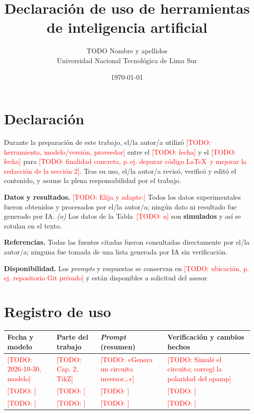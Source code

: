 \documentclass[12pt,a4paper]{article}
\title{Declaración de uso de herramientas de inteligencia artificial}
\author{TODO Nombre y apellidos \\ Universidad Nacional Tecnológica de Lima Sur}
\date{\today}
\newcommand{\todo}[1]{\textcolor{red}{[TODO: #1]}}
\begin{document}
\maketitle

\section{Declaración}
Durante la preparación de este trabajo, el/la autor/a utilizó
\todo{herramienta, modelo/versión, proveedor} entre el \todo{fecha} y el \todo{fecha}
para \todo{finalidad concreta, p.\,ej. depurar código \LaTeX\ y mejorar la redacción de la sección 2}.
Tras su uso, el/la autor/a revisó, verificó y editó el contenido, y asume la plena
responsabilidad por el trabajo.

\medskip
\noindent
\textbf{Datos y resultados.} \todo{Elija y adapte:}
Todos los datos experimentales fueron obtenidos y procesados por el/la autor/a;
ningún dato ni resultado fue generado por IA. \emph{(o)} Los datos de la Tabla~\todo{n}
son \textbf{simulados} y así se rotulan en el texto.

\medskip
\noindent
\textbf{Referencias.} Todas las fuentes citadas fueron consultadas directamente por el/la autor/a;
ninguna fue tomada de una lista generada por IA sin verificación.

\medskip
\noindent
\textbf{Disponibilidad.} Los \emph{prompts} y respuestas se conservan en
\todo{ubicación, p.\,ej. repositorio Git privado} y están disponibles a solicitud del asesor.

\section{Registro de uso}
\begin{longtable}{>{\raggedright}p{2.2cm}>{\raggedright}p{2.6cm}>{\raggedright}p{3.4cm}>{\raggedright\arraybackslash}p{5.4cm}}
  \toprule
  Fecha y modelo & Parte del trabajo & \emph{Prompt} (resumen) & Verificación y cambios hechos \\
  \midrule
  \endhead
  \todo{2026-10-30, modelo} & \todo{Cap. 2, TikZ} & \todo{«Genera un circuito inversor…»}
    & \todo{Simulé el circuito; corregí la polaridad del opamp} \\
  \todo{} & \todo{} & \todo{} & \todo{} \\
  \todo{} & \todo{} & \todo{} & \todo{} \\
  \bottomrule
\end{longtable}
\end{document}
